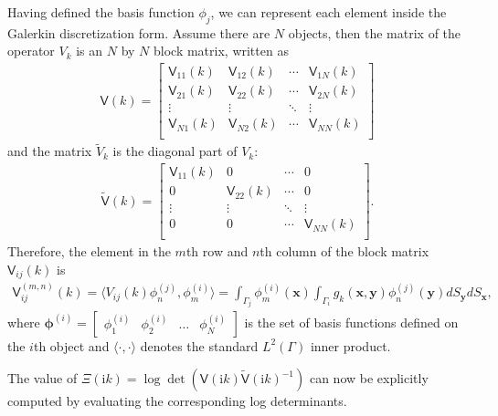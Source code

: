 Having defined the basis function $\phi_j$, we can represent each element inside the Galerkin discretization form. Assume there are $N$ objects,
then the matrix of the operator $V_k$ is an $N$ by $N$ block matrix, written as 
\begin{align}\label{matrix V}
    \mathsf{V}(k) = \begin{bmatrix}
        \mathsf{V}_{11}(k) & \mathsf{V}_{12}(k) & \cdots & \mathsf{V}_{1N}(k) \\
        \mathsf{V}_{21}(k) & \mathsf{V}_{22}(k) & \cdots & \mathsf{V}_{2N}(k) \\
        \vdots & \vdots & \ddots & \vdots \\
        \mathsf{V}_{N1}(k) & \mathsf{V}_{N2}(k) & \cdots & \mathsf{V}_{NN}(k) \\
\end{bmatrix}
\end{align}
and the matrix $\tilde{V}_{k}$ is the diagonal part of $V_{k}$:
\begin{align}\label{matrix tilde V}
    \tilde{\mathsf{V}}(k) = \begin{bmatrix}
        \mathsf{V}_{11}(k) & 0      & \cdots & 0 \\
    0      & \mathsf{V}_{22}(k) & \cdots & 0\\
    \vdots & \vdots & \ddots & \vdots \\
    0      & 0      & \cdots & \mathsf{V}_{NN}(k) \\
\end{bmatrix}.
\end{align}
Therefore, the element in the $m$th row and $n$th column of the block matrix $\mathsf{V}_{ij}(k)$ is 
\begin{align}\label{Elements in matrix V}
    \mathsf{V}_{ij}^{(m,n)} (k) = \langle V_{ij}(k)\phi_{n}^{(j)}, \phi_{m}^{(i)}\rangle = 
    \int_{\Gamma_{j}}\phi_{m}^{(i)}(\boldsymbol{x})\int_{\Gamma_{i}}g_{k}(\boldsymbol{x}, \boldsymbol{y})\phi_{n}^{(j)}(\boldsymbol{y})dS_{\boldsymbol{y}}dS_{\boldsymbol{x}},
\end{align}
where $\boldsymbol{\phi}^{(i)} = \begin{bmatrix}
    \phi_{1}^{(i)} & \phi_{2}^{(i)} & \dots & \phi_{N}^{(i)}
\end{bmatrix}$ is the set of basis functions defined on the $i$th object and $\langle \cdot, \cdot \rangle$
denotes the standard $L^{2}(\Gamma)$ inner product.


The value of $\Xi(\mathrm{i}k) = \log\det(\mathsf{V}(\mathrm{i}k)\tilde{\mathsf{V}}(\mathrm{i}k)^{-1})$ can now be explicitly computed by evaluating the corresponding log determinants.

